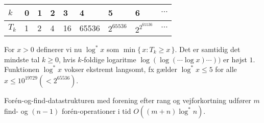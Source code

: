 \medskip
\begin{tabular}{l|lllllllc}
  $k$  & 0 & 1 & 2 & 3 & 4 & 5 & 6 & $\cdots$ \\\midrule
  $T_k$ & 1 & 2 & 4 & 16 & 65536 & $2^{65536}$ & $2^{2^{65536}}$ & $\cdots$
\end{tabular}
\medskip

For $x>0$ definerer vi nu $\log^* x$ som $\min\{\,x\colon T_k\geq x\,\}$.
Det er samtidig det mindste tal $k\geq 0$, hvis $k$-foldige logaritme  $\log (\log (\cdots\log x)\cdots))$ er højst $1$.
Funktionen $\log ^* x$ vokser ekstremt langsomt, fx gælder $\log^*x\leq 5$ for alle $x\leq 10^{19729}(<2^{65536})$.

\begin{thm}
  Forén-og-find-datastrukturen med forening efter rang og vejforkortning udfører $m$ find- og $(n-1)$ forén-operationer i tid $O((m+n)\log^* n)$.
\end{thm}

